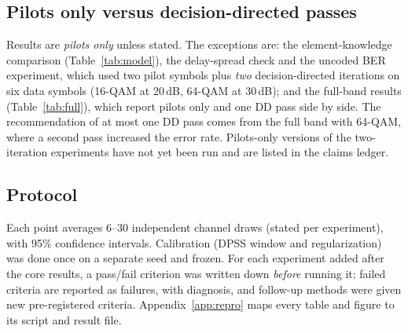 \subsection{Pilots only versus decision-directed passes}
Results are \emph{pilots only} unless stated. The exceptions are: the element-knowledge comparison
(Table~\ref{tab:model}), the delay-spread check and the uncoded BER experiment, which used two pilot
symbols plus \emph{two} decision-directed iterations on six data symbols (16-QAM at 20\,dB, 64-QAM at
30\,dB); and the full-band results (Table~\ref{tab:full}), which report pilots only and one DD pass side
by side. The recommendation of at most one DD pass comes from the full band with 64-QAM, where a second
pass increased the error rate. Pilots-only versions of the two-iteration experiments have not yet been
run and are listed in the claims ledger.

\subsection{Protocol}
Each point averages 6--30 independent channel draws (stated per experiment), with 95\%
confidence intervals. Calibration (DPSS window and regularization) was done once on a
separate seed and frozen. For each experiment added after the core results, a pass/fail
criterion was written down \emph{before} running it; failed criteria are reported as failures,
with diagnosis, and follow-up methods were given new pre-registered criteria. Appendix~\ref{app:repro}
maps every table and figure to its script and result file.
